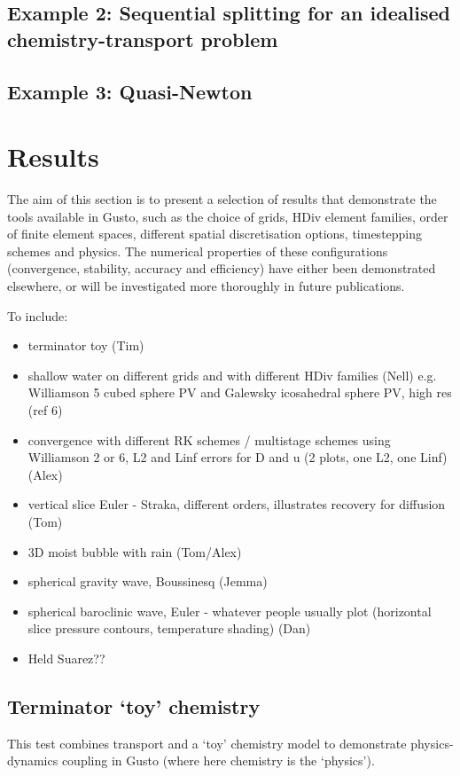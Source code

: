 \documentclass[journal abbreviation, manuscript]{copernicus}
\begin{document}
\subsection{Example 2: Sequential splitting for an idealised chemistry-transport problem}



\subsection{Example 3: Quasi-Newton }



\section{Results}
\label{sec: results}
The aim of this section is to present a selection of results that
demonstrate the tools available in Gusto, such as the choice of grids,
HDiv element families, order of finite element spaces, different
spatial discretisation options, timestepping schemes and physics. The
numerical properties of these configurations (convergence, stability,
accuracy and efficiency) have either been demonstrated elsewhere, or
will be investigated more thoroughly in future publications.

To include:
\begin{itemize}
\item terminator toy (Tim)
\item shallow water on different grids and with different HDiv
  families (Nell) e.g. Williamson 5 cubed sphere PV and Galewsky
  icosahedral sphere PV, high res (ref 6)
\item convergence with different RK schemes / multistage schemes using
  Williamson 2 or 6, L2 and Linf errors for D and u (2 plots, one L2,
  one Linf) (Alex)
\item vertical slice Euler - Straka, different orders, illustrates
  recovery for diffusion (Tom)
\item 3D moist bubble with rain (Tom/Alex)
\item spherical gravity wave, Boussinesq (Jemma)
\item spherical baroclinic wave, Euler - whatever people usually plot
  (horizontal slice pressure contours, temperature shading) (Dan)
\item Held Suarez??
\end{itemize}

\subsection{Terminator `toy' chemistry}
This test combines transport and a `toy' chemistry model to
demonstrate physics-dynamics coupling in Gusto (where here chemistry
is the `physics').
\end{document}
